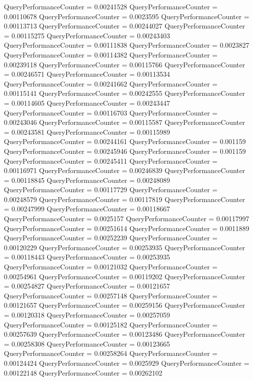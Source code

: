 \documentclass[9pt]{article}
\theoremstyle{plain}
\theoremstyle{definition}
\theoremstyle{remark}
\numberwithin{equation}{section}
\begin{document}
QueryPerformanceCounter  =  0.00241528
QueryPerformanceCounter  =  0.00110678
QueryPerformanceCounter  =  0.0023595
QueryPerformanceCounter  =  0.00113713
QueryPerformanceCounter  =  0.00244027
QueryPerformanceCounter  =  0.00115275
QueryPerformanceCounter  =  0.00243403
QueryPerformanceCounter  =  0.00111838
QueryPerformanceCounter  =  0.0023827
QueryPerformanceCounter  =  0.00114382
QueryPerformanceCounter  =  0.00239118
QueryPerformanceCounter  =  0.00115766
QueryPerformanceCounter  =  0.00246571
QueryPerformanceCounter  =  0.00113534
QueryPerformanceCounter  =  0.00241662
QueryPerformanceCounter  =  0.00115141
QueryPerformanceCounter  =  0.00242555
QueryPerformanceCounter  =  0.00114605
QueryPerformanceCounter  =  0.00243447
QueryPerformanceCounter  =  0.00116703
QueryPerformanceCounter  =  0.00243046
QueryPerformanceCounter  =  0.00115587
QueryPerformanceCounter  =  0.00243581
QueryPerformanceCounter  =  0.00115989
QueryPerformanceCounter  =  0.00244161
QueryPerformanceCounter  =  0.001159
QueryPerformanceCounter  =  0.00245946
QueryPerformanceCounter  =  0.001159
QueryPerformanceCounter  =  0.00245411
QueryPerformanceCounter  =  0.00116971
QueryPerformanceCounter  =  0.00246839
QueryPerformanceCounter  =  0.00118845
QueryPerformanceCounter  =  0.00248089
QueryPerformanceCounter  =  0.00117729
QueryPerformanceCounter  =  0.00248579
QueryPerformanceCounter  =  0.00117819
QueryPerformanceCounter  =  0.00247999
QueryPerformanceCounter  =  0.00118667
QueryPerformanceCounter  =  0.0025157
QueryPerformanceCounter  =  0.00117997
QueryPerformanceCounter  =  0.00251614
QueryPerformanceCounter  =  0.0011889
QueryPerformanceCounter  =  0.00252239
QueryPerformanceCounter  =  0.00120229
QueryPerformanceCounter  =  0.00253935
QueryPerformanceCounter  =  0.00118443
QueryPerformanceCounter  =  0.00253935
QueryPerformanceCounter  =  0.00121032
QueryPerformanceCounter  =  0.00254961
QueryPerformanceCounter  =  0.00119202
QueryPerformanceCounter  =  0.00254827
QueryPerformanceCounter  =  0.00121657
QueryPerformanceCounter  =  0.00257148
QueryPerformanceCounter  =  0.00121657
QueryPerformanceCounter  =  0.00259156
QueryPerformanceCounter  =  0.00120318
QueryPerformanceCounter  =  0.00257059
QueryPerformanceCounter  =  0.00125182
QueryPerformanceCounter  =  0.00257639
QueryPerformanceCounter  =  0.00123486
QueryPerformanceCounter  =  0.00258308
QueryPerformanceCounter  =  0.00123665
QueryPerformanceCounter  =  0.00258264
QueryPerformanceCounter  =  0.00124424
QueryPerformanceCounter  =  0.0025929
QueryPerformanceCounter  =  0.00122148
QueryPerformanceCounter  =  0.00262102
\end{document}
